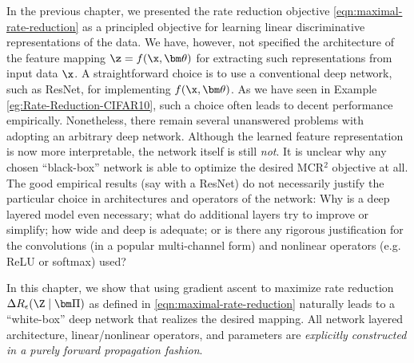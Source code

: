 \documentclass[../../book-main.tex]{subfiles}
\begin{document}
In the previous chapter, we presented the rate reduction objective \eqref{eqn:maximal-rate-reduction} as a principled objective for learning linear discriminative representations of the data. We have, however, not specified the architecture of the feature mapping $\z = f(\x, \bm \theta)$ for extracting such representations from input data $\x$. 
A straightforward choice is to use a conventional deep network, such as ResNet, for implementing $f(\x, \bm \theta)$. As we have seen in Example \ref{eg:Rate-Reduction-CIFAR10}, such a choice often leads to decent performance empirically. Nonetheless, there remain several unanswered problems with adopting an arbitrary deep network. Although the learned feature representation is now more interpretable, the network itself is still {\em not}. It is unclear why any chosen ``black-box'' network is able to optimize the desired MCR$^2$ objective at all. The good empirical results (say with a ResNet) do not necessarily justify the particular choice in architectures and operators of the network: Why is a deep layered model even necessary; what do additional layers try to improve or simplify; how wide and deep is adequate; or is there any rigorous justification for the convolutions (in a popular multi-channel form) and nonlinear operators (e.g. ReLU or softmax) used? 

In this chapter, we show that using gradient ascent to maximize rate reduction $\Delta R_{\epsilon}(\Z \mid \bm \Pi)$ as defined in \eqref{eqn:maximal-rate-reduction} naturally leads to a ``white-box'' deep network that realizes the desired mapping. All network layered architecture, linear/nonlinear operators, and parameters are {\em explicitly constructed in a purely forward propagation fashion}. 
\end{document}
